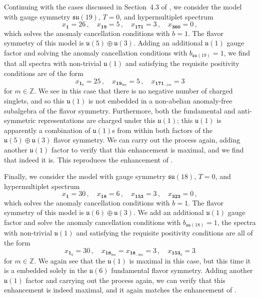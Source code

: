 \documentclass[11pt, a4paper]{article}
\newcommand*{\bbZ}{\ensuremath{\mathbb{Z}}}
\newcommand*{\fku}{\ensuremath{\mathfrak{u}}}
\newcommand*{\fksu}{\ensuremath{\mathfrak{su}}}
\begin{document}
Continuing with the cases discussed in Section~4.3 of \cite{Raghuram:2020vxm}, we consider the model with gauge symmetry $\fksu(19)$, $T = 0$, and hypermultiplet spectrum
    \begin{equation}
        x_{\bm{1}} = 26\,, \quad x_{\bm{19}} = 5\,, \quad x_{\bm{171}} = 3\,, \quad x_{\bm{360}} = 0\,,
    \end{equation}
which solves the anomaly cancellation conditions with $b = 1$. The flavor symmetry of this model is $\fku(5) \oplus \fku(3)$. Adding an additional $\fku(1)$ gauge factor and solving the anomaly cancellation conditions  with $b_{\fksu(19)} = 1$, we find that all spectra with non-trivial $\fku(1)$ and satisfying the requisite positivity conditions are of the form
    \begin{equation}
        x_{\bm{1}_0} = 25\,, \quad x_{\bm{19}_{9 m}} = 5\,, \quad x_{\bm{171}_{-1 m}} = 3
    \end{equation}
for $m \in \bbZ$. We see in this case that there is no negative number of charged singlets, and so this $\fku(1)$ is not embedded in a non-abelian anomaly-free subalgebra of the flavor symmetry. Furthermore, both the fundamental and anti-symmetric representations are charged under this $\fku(1)$; this $\fku(1)$ is apparently a combination of $\fku(1)$s from within both factors of the $\fku(5) \oplus \fku(3)$ flavor symmetry. We can carry out the process again, adding another $\fku(1)$ factor to verify that this enhancement is maximal, and we find that indeed it is. This reproduces the enhancement of \cite{Raghuram:2020vxm}.

Finally, we consider the model with gauge symmetry $\fksu(18)$, $T = 0$, and hypermultiplet spectrum
    \begin{equation}
        x_{\bm{1}} = 30\,, \quad x_{\bm{18}} = 6\,, \quad x_{\bm{153}} = 3\,, \quad x_{\bm{323}} = 0\,,
    \end{equation}
which solves the anomaly cancellation conditions with $b = 1$. The flavor symmetry of this model is $\fku(6) \oplus \fku(3)$. We add an additional $\fku(1)$ gauge factor and solve the anomaly cancellation conditions  with $b_{\fksu(18)} = 1$,
the spectra with non-trivial $\fku(1)$ and satisfying the requisite positivity conditions are all of the form
    \begin{equation}
        x_{\bm{1}_0} = 30\,, \quad x_{\bm{18}_{9 m}} = x_{\bm{18}_{-9 m}} = 3\,, \quad x_{\bm{153}_0} = 3
    \end{equation}
for $m \in \bbZ$. We again see that the $\fku(1)$ is maximal in this case, but this time it is a embedded solely in the $\fku(6)$ fundamental flavor symmetry. Adding another $\fku(1)$ factor and carrying out the process again, we can verify that this enhancement is indeed maximal, and it again matches the enhancement of \cite{Raghuram:2020vxm}.
\end{document}
